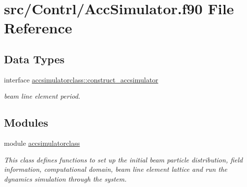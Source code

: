 \hypertarget{_acc_simulator_8f90}{}\section{src/\+Contrl/\+Acc\+Simulator.f90 File Reference}
\label{_acc_simulator_8f90}
\subsection*{Data Types}
\begin{DoxyCompactItemize}
\item 
interface \mbox{\hyperlink{interfaceaccsimulatorclass_1_1construct__accsimulator}{accsimulatorclass\+::construct\+\_\+accsimulator}}
\begin{DoxyCompactList}\small\item\em beam line element period. \end{DoxyCompactList}\end{DoxyCompactItemize}
\subsection*{Modules}
\begin{DoxyCompactItemize}
\item 
module \mbox{\hyperlink{namespaceaccsimulatorclass}{accsimulatorclass}}
\begin{DoxyCompactList}\small\item\em This class defines functions to set up the initial beam particle distribution, field information, computational domain, beam line element lattice and run the dynamics simulation through the system. \end{DoxyCompactList}\end{DoxyCompactItemize}
